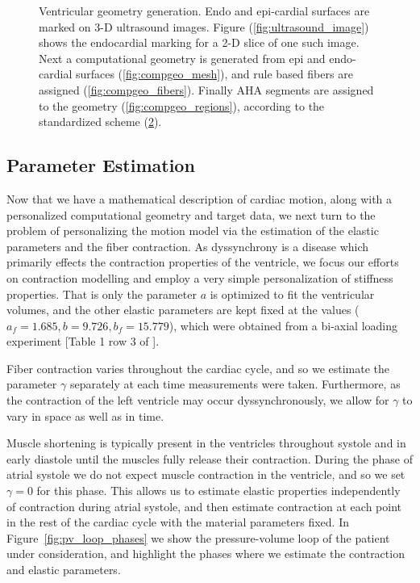 \begin{figure}[htbp]
\begin{subfigure}[t]{0.35\textwidth}
    \caption{\label{fig:bullseye}}
  \end{subfigure}
\caption{Ventricular geometry generation. Endo and epi-cardial surfaces 
are marked on 3-D ultrasound images. Figure (\ref{fig:ultrasound_image}) shows the endocardial 
marking for a 2-D slice of one such image. Next a computational geometry is generated
from epi and endo-cardial surfaces (\ref{fig:compgeo_mesh}), and rule based
fibers are assigned (\ref{fig:compgeo_fibers}). Finally AHA segments are assigned
to the geometry (\ref{fig:compgeo_regions}), according to the standardized scheme
(\ref{fig:bullseye}).}
\end{figure}

\subsection{Parameter Estimation}
\label{sec:paramest}
Now that we have a mathematical description of cardiac motion, along
with a personalized computational geometry and target data, we next turn to the
problem of personalizing the motion model via the estimation of the
elastic parameters and the fiber contraction. As dyssynchrony is a disease 
which primarily effects the contraction properties of the ventricle,
we focus our efforts on contraction modelling and employ a very simple
personalization of stiffness properties. That is only the parameter $a$
is optimized to fit the ventricular volumes, and the other elastic parameters
are kept fixed at the values ($a_f = 1.685, b = 9.726, b_f = 15.779$),
which were obtained from a bi-axial loading experiment 
[Table 1 row 3 of \cite{Holzapfel2009}].



Fiber contraction varies throughout the cardiac cycle, and so we estimate
the parameter $\gamma$ separately at each time measurements were taken.
Furthermore, as the contraction of the left ventricle may occur dyssynchronously, we
allow for $\gamma$ to vary in space as well as in time.


Muscle shortening is typically present in the ventricles
throughout systole and in early diastole until the muscles fully release
their contraction. During the phase of atrial systole we do not expect
muscle contraction in the ventricle, and so we set $\gamma = 0$ for
this phase. This allows us to estimate elastic properties
independently of contraction during atrial systole, and then estimate
contraction at each point in the rest of the cardiac cycle with the
material parameters fixed. In Figure~\ref{fig:pv_loop_phases} we show
the pressure-volume loop of the patient under consideration, and
highlight the phases where we estimate the contraction and elastic
parameters.

